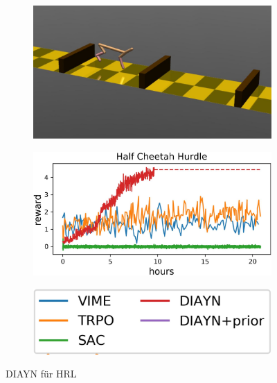 \smallspace

\begin{figure}[h]
\begin{subfigure}{0.38\textwidth}
\includegraphics[width=\textwidth, keepaspectratio=true]{images/cheetah_hurdle_image.JPG}
\caption{} \label{img:cheetah_hurdle_img}
\end{subfigure}
\begin{subfigure}{0.4\textwidth}
\includegraphics[width=\textwidth, keepaspectratio=true]{images/cheetah_hurdle.JPG}
\caption{} \label{img:cheetah_hurdle_graph}
\end{subfigure}
\begin{subfigure}{0.2\textwidth}
\includegraphics[width=\textwidth, keepaspectratio=true]{images/cheetah_hurdle_exp.JPG}
\end{subfigure}
\caption{DIAYN für HRL} \label{img:cheetah_hurdle}
\end{figure}

